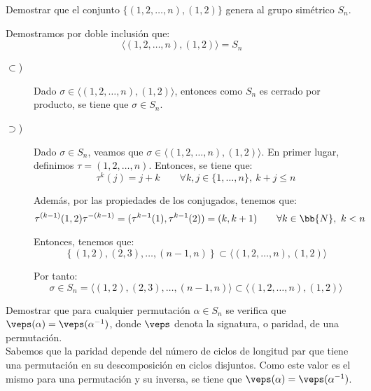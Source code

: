 \begin{ejercicio}\label{ej:2.22}
    Demostrar que el conjunto $\{(1, 2, \ldots, n), (1, 2)\}$ genera al grupo simétrico $S_n$.

    Demostramos por doble inclusión que:
    \begin{equation*}
        \langle (1, 2, \ldots, n), (1, 2) \rangle = S_n
    \end{equation*}

    \begin{description}
        \item[$\subset$)] Dado $\sigma\in \langle (1, 2, \ldots, n), (1, 2) \rangle$, entonces como $S_n$ es cerrado por producto, se tiene que $\sigma\in S_n$.
        
        \item[$\supset$)] Dado $\sigma\in S_n$, veamos que $\sigma\in \langle (1, 2, \ldots, n), (1, 2) \rangle$. En primer lugar, definimos $\tau=(1, 2, \ldots, n)$. Entonces, se tiene que:
        \begin{equation*}
            \tau^k(j) = j+k\qquad \forall k,j\in \{1, \ldots, n\},~k+j\leq n
        \end{equation*}

        Además, por las propiedades de los conjugados, tenemos que:
        \begin{equation*}
            \tau^{(k-1)}(1, 2)\tau^{-(k-1)} = (\tau^{k-1}(1), \tau^{k-1}(2)) = (k, k+1)\qquad \forall k\in\bb{N},~k< n
        \end{equation*}

        Entonces, tenemos que:
        \begin{equation*}
            \left\{(1,2), (2,3), \ldots, (n-1, n)\right\} \subset \langle (1, 2, \ldots, n), (1, 2) \rangle
        \end{equation*}

        Por tanto:
        \begin{equation*}
            \sigma\in S_n=\langle (1, 2), (2, 3), \ldots, (n-1, n) \rangle \subset \langle (1, 2, \ldots, n), (1, 2) \rangle
        \end{equation*}
    \end{description}
\end{ejercicio}

\begin{ejercicio}\label{ej:2.23}
    Demostrar que para cualquier permutación $\alpha \in S_n$ se verifica que $\veps(\alpha) = \veps(\alpha^{-1})$, donde $\veps$ denota la signatura, o paridad, de una permutación.\\

    Sabemos que la paridad depende del número de ciclos de longitud par que tiene una permutación en su descomposición en ciclos disjuntos. Como este valor es el mismo para una permutación y su inversa, se tiene que $\veps(\alpha) = \veps(\alpha^{-1})$.
\end{ejercicio}

